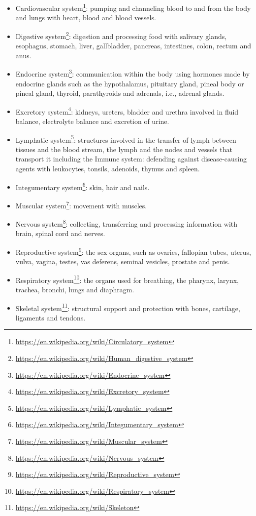 \documentclass[]{book}
\providecommand{\tightlist}{%
  \setlength{\itemsep}{0pt}\setlength{\parskip}{0pt}}
\let\rmarkdownfootnote\footnote%
\def\footnote{\protect\rmarkdownfootnote}
\renewcommand{\href}[2]{#2\footnote{\url{#1}}}
\begin{document}
\begin{itemize}
\tightlist
\item
  \href{https://en.wikipedia.org/wiki/Circulatory_system}{Cardiovascular system}: pumping and channeling blood to and from the body and lungs with heart, blood and blood vessels.
\item
  \href{https://en.wikipedia.org/wiki/Human_digestive_system}{Digestive system}: digestion and processing food with salivary glands, esophagus, stomach, liver, gallbladder, pancreas, intestines, colon, rectum and anus.
\item
  \href{https://en.wikipedia.org/wiki/Endocrine_system}{Endocrine system}: communication within the body using hormones made by endocrine glands such as the hypothalamus, pituitary gland, pineal body or pineal gland, thyroid, parathyroids and adrenals, i.e., adrenal glands.
\item
  \href{https://en.wikipedia.org/wiki/Excretory_system}{Excretory system}: kidneys, ureters, bladder and urethra involved in fluid balance, electrolyte balance and excretion of urine.
\item
  \href{https://en.wikipedia.org/wiki/Lymphatic_system}{Lymphatic system}: structures involved in the transfer of lymph between tissues and the blood stream, the lymph and the nodes and vessels that transport it including the Immune system: defending against disease-causing agents with leukocytes, tonsils, adenoids, thymus and spleen.
\item
  \href{https://en.wikipedia.org/wiki/Integumentary_system}{Integumentary system}: skin, hair and nails.
\item
  \href{https://en.wikipedia.org/wiki/Muscular_system}{Muscular system}: movement with muscles.
\item
  \href{https://en.wikipedia.org/wiki/Nervous_system}{Nervous system}: collecting, transferring and processing information with brain, spinal cord and nerves.
\item
  \href{https://en.wikipedia.org/wiki/Reproductive_system}{Reproductive system}: the sex organs, such as ovaries, fallopian tubes, uterus, vulva, vagina, testes, vas deferens, seminal vesicles, prostate and penis.
\item
  \href{https://en.wikipedia.org/wiki/Respiratory_system}{Respiratory system}: the organs used for breathing, the pharynx, larynx, trachea, bronchi, lungs and diaphragm.
\item
  \href{https://en.wikipedia.org/wiki/Skeleton}{Skeletal system}: structural support and protection with bones, cartilage, ligaments and tendons.
\end{itemize}
\end{document}
